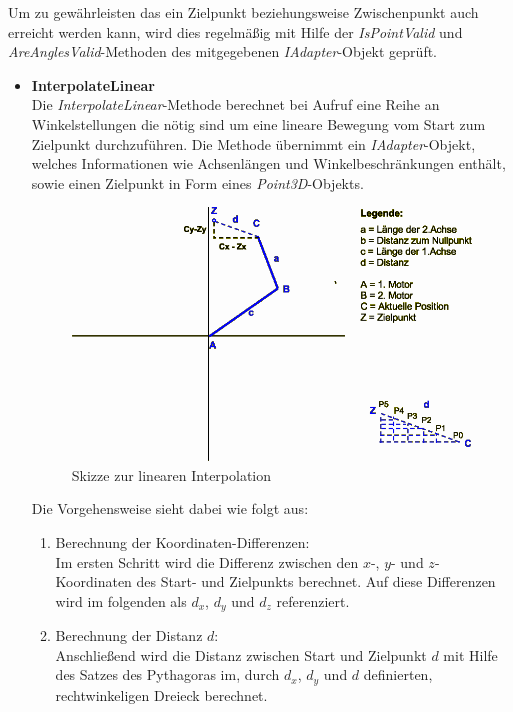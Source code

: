 Um zu gewährleisten das ein Zielpunkt beziehungsweise Zwischenpunkt auch erreicht werden kann, wird dies regelmäßig mit Hilfe der \textit{IsPointValid} und \textit{AreAnglesValid}-Methoden des mitgegebenen \textit{IAdapter}-Objekt geprüft.
\begin{itemize}
\item \textbf{InterpolateLinear}\\
Die \textit{InterpolateLinear}-Methode berechnet bei Aufruf eine Reihe an Winkelstellungen die nötig sind um eine lineare Bewegung vom Start zum Zielpunkt durchzuführen. Die Methode übernimmt ein \textit{IAdapter}-Objekt, welches Informationen wie Achsenlängen und Winkelbeschränkungen enthält, sowie einen Zielpunkt in Form eines \textit{Point3D}-Objekts.\\
\begin{figure}[H]
  \centering
  \begin{minipage}[t]{14 cm}
  	\centering
  	\includegraphics[width=12cm]{images/Linearinterpolation} 
    \caption{Skizze zur linearen Interpolation}
  \end{minipage}
\end{figure}
\newpage
Die Vorgehensweise sieht dabei wie folgt aus:
\begin{enumerate}
\item Berechnung der Koordinaten-Differenzen:\\
Im ersten Schritt wird die Differenz zwischen den $x$-, $y$- und $z$-Koordinaten des Start- und Zielpunkts berechnet. Auf diese Differenzen wird im folgenden als $d_x$, $d_y$ und $d_z$ referenziert. 
\item Berechnung der Distanz $d$:\\
Anschließend wird die Distanz zwischen Start und Zielpunkt $d$ mit Hilfe des Satzes des Pythagoras im, durch $d_x$, $d_y$ und $d$ definierten, rechtwinkeligen Dreieck berechnet.

\end{enumerate}
\end{itemize}
